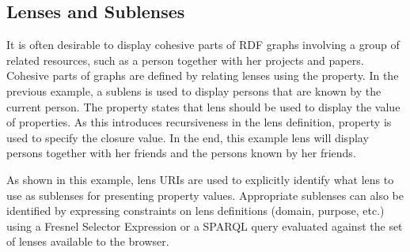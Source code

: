 \subsection{Lenses and Sublenses}

It is often desirable to display cohesive parts of RDF graphs involving a group of related resources, such as a person together with her projects and papers. Cohesive parts of graphs are defined by relating lenses using the  property. In the previous example, a sublens is used to display persons that are known by the current person. The  property states that lens  should be used to display the value of  properties. As this introduces recursiveness in the lens definition, property  is used to specify the closure value. In the end, this example lens will display persons together with her friends and the persons known by her friends.

As shown in this example, lens URIs are used to explicitly identify what lens to use as sublenses for presenting property values. Appropriate sublenses can also be identified by expressing constraints on lens definitions (domain, purpose, etc.) using a Fresnel Selector Expression or a SPARQL query evaluated against the set of lenses available to the browser.

